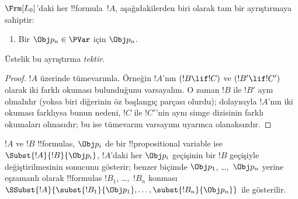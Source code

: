 \begin{prop}
$\Frm[L_0]$'daki her !!{formula}~$!A$, aşağıdakilerden biri olarak tam bir
ayrıştırmaya sahiptir:
\begin{enumerate}


\item Bir $\Obj p_n \in \PVar$ için $\Obj p_n$.
  




\end{enumerate}
Üstelik bu ayrıştırma \emph{tektir}.
\end{prop}

\begin{proof}
$!A$ üzerinde tümevarımla. Örneğin $!A$'nın $(!B \lif !C)$ ve
$(!B' \lif !C')$ olarak iki farklı okuması bulunduğunu varsayalım. O zaman
$!B$ ile $!B'$ aynı olmalıdır (yoksa biri diğerinin öz başlangıç parçası
olurdu); dolayısıyla $!A$'nın iki okuması farklıysa bunun nedeni, $!C$ ile
$!C'$'nin aynı simge dizisinin farklı okumaları olmasıdır; bu ise tümevarım
varsayımı uyarınca olanaksızdır.
\end{proof}


\begin{defn}
$!A$ ve $!B$ !!{formula}s, $\Obj p_i$ de bir !!{propositional
variable}
ise $\Subst{!A}{!B}{\Obj p_i}$, $!A$'daki her $\Obj p_i$ geçişinin bir $!B$
geçişiyle değiştirilmesinin sonucunu gösterir; benzer biçimde $\Obj p_1$,
\dots,~$\Obj p_n$ yerine eşzamanlı olarak !!{formula}s $!B_1$,
\dots,~$!B_n$ konması
$\SSubst{!A}{\subst{!B_1}{\Obj p_1},\dots,\subst{!B_n}{\Obj p_n}}$
ile gösterilir.
\end{defn}

